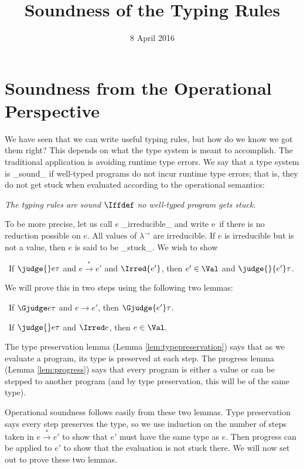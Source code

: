 \title{Soundness of the Typing Rules}
\date{8 April 2016}
\maketitle

\section{Soundness from the Operational Perspective}

We have seen that we can write useful typing rules, but how do we know we got them right?
This depends on what the type system is meant to accomplish.
The traditional application is avoiding runtime type errors.
We say that a type system is _sound_ if well-typed programs do not incur
runtime type errors; that is, they do not get stuck when evaluated
according to the operational semantics:
\begin{center}
\emph{The typing rules are sound} $\Iffdef$ \emph{no well-typed program gets stuck.}
\end{center}

To be more precise, let us call $e$ _irreducible_ and write \Irred e\
if there is no reduction possible on $e$. All values of $\lambda^\to$
are irreducible. If $e$ is irreducible but is not a value, then $e$ is
said to be _stuck_. We wish to show
\begin{theorem}
\label{lem:operationalsoundness}\
If $\judge{}e\tau$ and $e \stackrel*\to e'$ and $\Irred{e'}$, then $e'\in\Val$ and $\judge{}{e'}\tau$.
\end{theorem}
We will prove this in two steps using the following two lemmas:
\begin{lemma}[Type Preservation]
\label{lem:typepreservation}\
If $\Gjudge e\tau$ and $e \to e'$, then $\Gjudge{e'}\tau$.
\end{lemma}
\begin{lemma}[Progress]
\label{lem:progress}\
If $\judge{}e\tau$ and $\Irred e$, then $e\in\Val$.
\end{lemma}
The type preservation lemma (Lemma \ref{lem:typepreservation}) says that as we evaluate a program, its type is preserved at each step. The progress lemma (Lemma \ref{lem:progress}) says that every program is either a value or can be stepped to another program (and by type preservation, this will be of the same type).

Operational soundness follows easily from these two lemmas. Type preservation
says every step preserves the type, so we use
induction on the number of steps taken in $e \stackrel*\to e'$ to show
that $e'$ must have the same type as $e$. Then progress can
be applied to $e'$ to show that the evaluation is not stuck there.
We will now set out to prove these two lemmas.

